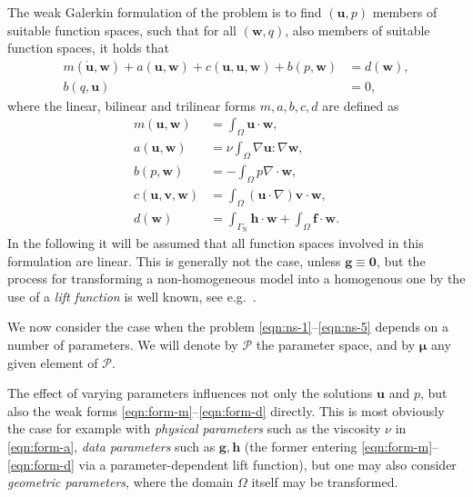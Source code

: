 \documentclass[a4paper]{jpconf}
\begin{document}
The weak Galerkin formulation of the problem is to find $(\bm u, p)$
members of suitable function spaces, such that for all $(\bm w, q)$,
also members of suitable function spaces, it holds that
\begin{align}
  m(\dot{\bm u}, \bm w) + a(\bm u, \bm w) + c(\bm u, \bm u, \bm w) + b(p, \bm w) &= d(\bm w), \label{eqn:var-1} \\
  b(q, \bm u) &= 0, \label{eqn:var-2}
\end{align}
where the linear, bilinear and trilinear forms $m,a,b,c,d$ are defined as
\begin{subequations}
\begin{align}
  m(\bm u, \bm w) &= \int_\Omega \bm u \cdot \bm w, \label{eqn:form-m} \\
  a(\bm u, \bm w) &= \nu \int_\Omega \nabla \bm u : \nabla \bm w, \label{eqn:form-a} \\
  b(p, \bm w) &= -\int_\Omega p \nabla \cdot \bm w, \label{eqn:form-b} \\
  c(\bm u, \bm v, \bm w) &= \int_\Omega (\bm u \cdot \nabla) \bm v \cdot \bm w, \label{eqn:form-c} \\
  d(\bm w) &= \int_{\Gamma_\text{N}} \bm h \cdot \bm w + \int_{\Omega} \bm f \cdot \bm w. \label{eqn:form-d}
\end{align}
\end{subequations}
In the following it will be assumed that all function spaces involved
in this formulation are linear.  This is generally not the case,
unless $\bm g \equiv \bm 0$, but the process for transforming a
non-homogeneous model into a homogenous one by the use of a
\emph{lift function} is well known, see e.g.~\cite{Fonn2018fdc}.

We now consider the case when the problem \eqref{eqn:ns-1}--\eqref{eqn:ns-5}
depends on a number of parameters.  We will denote by $\mathcal{P}$
the parameter space, and by $\bm \mu$ any given element of $\mathcal{P}$.

The effect of varying parameters influences not only the solutions
$\bm u$ and $p$, but also the weak forms
\eqref{eqn:form-m}--\eqref{eqn:form-d} directly.  This is most
obviously the case for example with \emph{physical parameters} such as
the viscosity $\nu$ in \eqref{eqn:form-a}, \emph{data parameters} such
as $\bm g, \bm h$ (the former entering
\eqref{eqn:form-m}--\eqref{eqn:form-d} via a parameter-dependent lift
function), but one may also consider \emph{geometric parameters},
where the domain $\Omega$ itself may be transformed.
\end{document}
